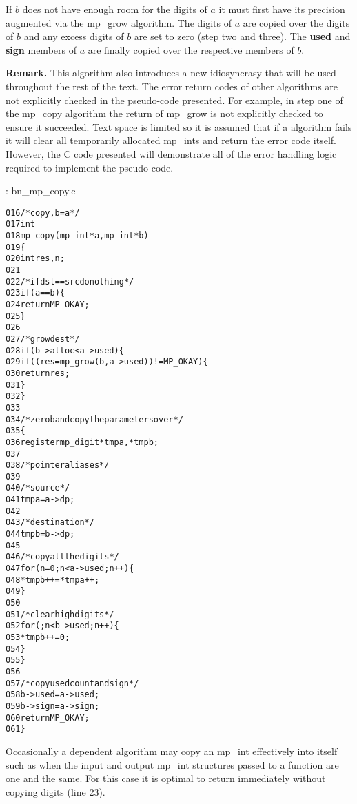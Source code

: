 \documentclass[b5paper]{book}
\begin{document}
If $b$ does not have enough room for the digits of $a$ it must first have its precision augmented via the mp\_grow 
algorithm.  The digits of $a$ are copied over the digits of $b$ and any excess digits of $b$ are set to zero (step two
and three).  The \textbf{used} and \textbf{sign} members of $a$ are finally copied over the respective members of
$b$.

\textbf{Remark.}  This algorithm also introduces a new idiosyncrasy that will be used throughout the rest of the
text.  The error return codes of other algorithms are not explicitly checked in the pseudo-code presented.  For example, in 
step one of the mp\_copy algorithm the return of mp\_grow is not explicitly checked to ensure it succeeded.  Text space is 
limited so it is assumed that if a algorithm fails it will clear all temporarily allocated mp\_ints and return
the error code itself.  However, the C code presented will demonstrate all of the error handling logic required to 
implement the pseudo-code.

\vspace{+3mm}\begin{small}
\hspace{-5.1mm}{\bf File}: bn\_mp\_copy.c
\vspace{-3mm}
\begin{alltt}
016   /* copy, b = a */
017   int
018   mp_copy (mp_int * a, mp_int * b)
019   \{
020     int     res, n;
021   
022     /* if dst == src do nothing */
023     if (a == b) \{
024       return MP_OKAY;
025     \}
026   
027     /* grow dest */
028     if (b->alloc < a->used) \{
029        if ((res = mp_grow (b, a->used)) != MP_OKAY) \{
030           return res;
031        \}
032     \}
033   
034     /* zero b and copy the parameters over */
035     \{
036       register mp_digit *tmpa, *tmpb;
037   
038       /* pointer aliases */
039   
040       /* source */
041       tmpa = a->dp;
042   
043       /* destination */
044       tmpb = b->dp;
045   
046       /* copy all the digits */
047       for (n = 0; n < a->used; n++) \{
048         *tmpb++ = *tmpa++;
049       \}
050   
051       /* clear high digits */
052       for (; n < b->used; n++) \{
053         *tmpb++ = 0;
054       \}
055     \}
056   
057     /* copy used count and sign */
058     b->used = a->used;
059     b->sign = a->sign;
060     return MP_OKAY;
061   \}
\end{alltt}
\end{small}

Occasionally a dependent algorithm may copy an mp\_int effectively into itself such as when the input and output
mp\_int structures passed to a function are one and the same.  For this case it is optimal to return immediately without 
copying digits (line 23).  
\end{document}
